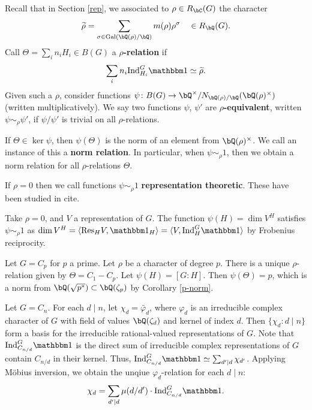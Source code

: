 Recall that in Section \ref{rep}, we associated to $\rho \in R_{\bC}(G)$ the character
    \[ \widetilde{\rho} = \sum_{\sigma \in \Gal(\bQ(\rho) / \bQ)} m(\rho) \rho^{\sigma} \quad \in R_{\bQ}(G) .\]
 Call $\Theta = \sum_i n_i H_i \in B(G)$ a \textbf{$\rho$-relation} if 
    \[ \sum_i n_i \Ind_{H_i}^G \trivial \simeq \widetilde{\rho}. \]
Given such a $\rho$, consider functions $\psi \colon B(G) \to \bQ^{\times} / N_{\bQ(\rho) / \bQ}(\bQ(\rho)^\times)$ (written multiplicatively). We say two functions $\psi$, $\psi'$ are \textbf{$\rho$-equivalent}, written $\psi \sim_{\rho} \psi'$, if $\psi / \psi'$ is trivial on all $\rho$-relations. 

If $\Theta \in \ker \psi$, then $\psi(\Theta)$ is the norm of an element from $\bQ(\rho)^{\times}$. We call an instance of this a \textbf{norm relation}.
In particular, when $\psi \sim_{\rho} 1$, then we obtain a norm relation for all $\rho$-relations $\Theta$. 

\begin{rem}
    If $\rho = 0$ then we call functions $\psi \sim_{\rho} 1$ \textbf{representation theoretic}. These have been studied in {\color{red} cite}.
\end{rem}

\begin{example}
  Take $\rho = 0$, and $V$ a representation of $G$. The function $\psi(H) = \dim V^H$ satisfies $\psi \sim_{\rho} 1$ as $\dim V^H = \langle \Res_{H} V , \trivial_H \rangle = \langle V, \Ind_{H}^G \trivial \rangle$ by Frobenius reciprocity.
\end{example}

\begin{example}
    Let $G = C_p$ for $p$ a prime. Let $\rho$ be a character of degree $p$. There is a unique $\rho$-relation given by $\Theta = C_1 - C_p$. Let $\psi(H) = [G \colon H]$. Then $\psi(\Theta) = p$, which is a norm from $\bQ(\sqrt{p^*}) \subset \bQ(\zeta_p)$ by Corollary \ref{p-norm}. 
\end{example}

\begin{example}\label{cyclic-relns}
Let $G = C_n$. For each $d \mid n$, let $\chi_d = \widetilde{\varphi_d}$, where $\varphi_d$ is an irreducible complex character of $G$ with field of values $\bQ(\zeta_d)$ and kernel of index $d$.
Then $\{ \chi_d \colon d\mid n \}$ form a basis for the irreducible rational-valued representations of $G$. Note that $\Ind_{C_{n/ d}}^G \trivial$ is the direct sum of irreducible complex representations of $G$ contain $C_{n / d}$ in their kernel. Thus, $\Ind_{C_{n/ d}}^G \trivial \simeq \sum_{d' \mid d} \chi_{d'}$. Applying M\"{o}bius inversion, we obtain the unqiue $\varphi_d$-relation for each $d \mid n$:
\[ \chi_d = \sum_{d' \mid d} \mu(d / d') \cdot \Ind_{C_{n/ d}}^G \trivial. \]
\end{example}


